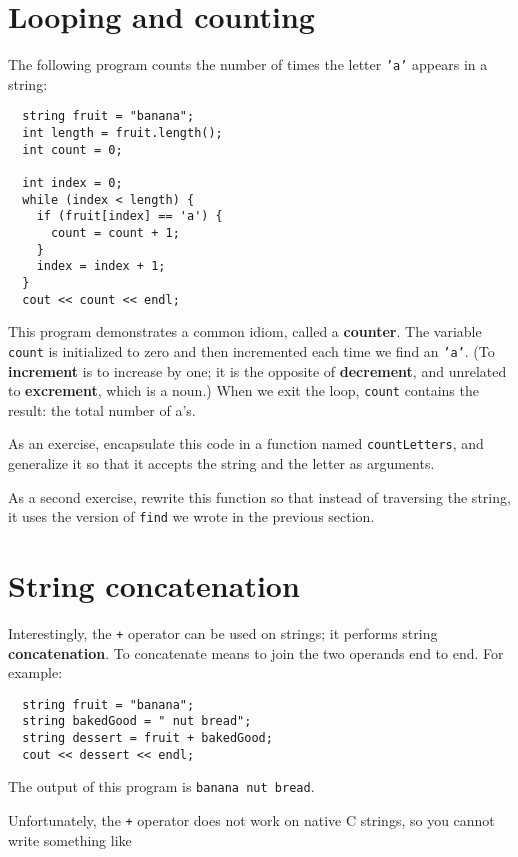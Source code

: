 \section{Looping and counting}
\label{loopcount}

The following program counts the
number of times the letter {\tt 'a'} appears in a string:

\begin{verbatim}
  string fruit = "banana";
  int length = fruit.length();
  int count = 0;

  int index = 0;
  while (index < length) {
    if (fruit[index] == 'a') {
      count = count + 1;
    }
    index = index + 1;
  }
  cout << count << endl;
\end{verbatim}
%
This program demonstrates a common idiom, called a {\bf counter}.  The
variable {\tt count} is initialized to zero and then incremented each
time we find an {\tt 'a'}.  (To {\bf increment} is to increase by one;
it is the opposite of {\bf decrement}, and unrelated to {\bf
excrement}, which is a noun.)  When we exit the loop, {\tt count}
contains the result: the total number of a's.


As an exercise, encapsulate this code in a function named
{\tt countLetters}, and generalize it so that it accepts the
string and the letter as arguments.


As a second exercise, rewrite this function so that instead
of traversing the string, it uses the version of
{\tt find} we wrote in the previous section.


\section{String concatenation}

Interestingly, the {\tt +} operator can be used on strings;
it performs string {\bf concatenation}.  To concatenate means to
join the two operands end to end.  For example:

\begin{verbatim}
  string fruit = "banana";
  string bakedGood = " nut bread";
  string dessert = fruit + bakedGood;
  cout << dessert << endl;
\end{verbatim}
%
The output of this program is {\tt banana nut bread}.

Unfortunately, the {\tt +} operator does not work on native
C strings, so you cannot write something like

